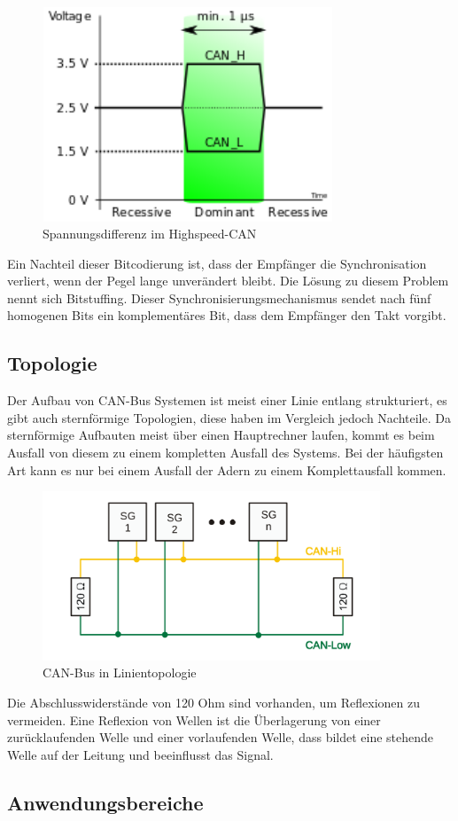 \begin{figure}[h]
    \begin{center}
        \includegraphics[width=8.66cm, height=6.39cm]{images/Abbildung 8.png}
        \caption{Spannungsdifferenz im Highspeed-CAN}
        \label{Highspeed-CAN}
        \end{center}
\end{figure}
Ein Nachteil dieser Bitcodierung ist, dass der Empfänger die Synchronisation verliert, wenn der Pegel lange unverändert bleibt. Die Lösung zu diesem Problem nennt sich Bitstuffing. Dieser Synchronisierungsmechanismus sendet nach fünf homogenen Bits ein komplementäres Bit, dass dem Empfänger den Takt vorgibt. \\

\subsection{Topologie}
Der Aufbau von CAN-Bus Systemen ist meist einer Linie entlang strukturiert, es gibt auch sternförmige Topologien, diese haben im Vergleich jedoch Nachteile. Da sternförmige Aufbauten meist über einen Hauptrechner laufen, kommt es beim Ausfall von diesem zu einem kompletten Ausfall des Systems. Bei der häufigsten Art kann es nur bei einem Ausfall der Adern zu einem Komplettausfall kommen. \\

\begin{figure}[h]
    \begin{center}
        \includegraphics[width=10.08cm, height=5.04cm]{images/Abbildung 9.png}
        \caption{CAN-Bus in Linientopologie}
        \label{Linientopologie}
        \end{center}
\end{figure}
Die Abschlusswiderstände von 120 Ohm sind vorhanden, um Reflexionen zu vermeiden. Eine Reflexion von Wellen ist die Überlagerung von einer zurücklaufenden Welle und einer vorlaufenden Welle, dass bildet eine stehende Welle auf der Leitung und beeinflusst das Signal. 

\clearpage

\subsection{Anwendungsbereiche}
